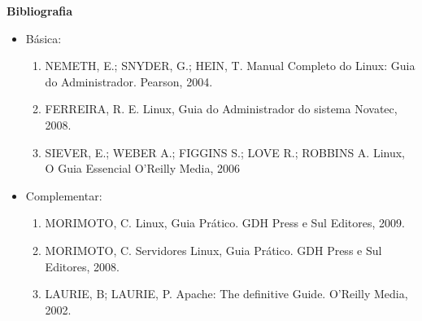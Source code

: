 





\begin{snugshade}\begin{center}\textbf{
    Bibliografia
}\end{center}\end{snugshade}

\begin{itemize} 

\item Básica:
    \begin{enumerate}

    \item NEMETH, E.; SNYDER, G.; HEIN, T.
          Manual Completo do Linux: Guia do Administrador.
          Pearson, 2004.
    
    \item FERREIRA, R. E.
          Linux, Guia do Administrador do sistema
          Novatec, 2008.
    
    \item SIEVER, E.; WEBER A.; FIGGINS S.; LOVE R.; ROBBINS A.
          Linux, O Guia Essencial
          O'Reilly Media, 2006
	
    \end{enumerate}

\item Complementar:
	\begin{enumerate} 

    \item MORIMOTO, C.
          Linux, Guia Prático.
          GDH Press e Sul Editores, 2009.

    \item MORIMOTO, C.
          Servidores Linux, Guia Prático.
          GDH Press e Sul Editores, 2008.

    \item LAURIE, B; LAURIE, P.
          Apache: The definitive Guide.
          O'Reilly Media, 2002.

	\end{enumerate}

\end{itemize}

